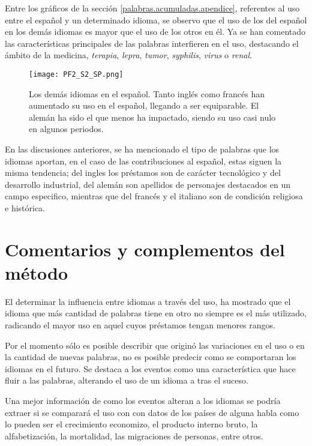 Entre los gráficos de la sección \ref{palabras.acumuladas.apendice},   referentes al uso entre el español y un determinado idioma, se observo que el uso de los del español en los demás idiomas es mayor que el uso de los otros en él.  Ya se han comentado las características principales de las palabras interfieren en el uso, destacando el ámbito de la medicina, \textit{terapia}, \textit{lepra}, \textit{tumor}, \textit{syphilis}, \textit{virus} o \textit{renal}. 

		
\begin{figure}[h!] %
	\centering
	\texttt{[image: PF2\_S2\_SP.png]}
	\label{fig.ST_b_SP}
	\caption{Los demás idiomas en el español.  Tanto inglés como francés han aumentado su uso  en el español, llegando a ser equiparable. El alemán ha sido el que menos ha impactado, siendo su uso casi nulo en  algunos periodos.}
\end{figure}

En las discusiones anteriores, se ha mencionado el tipo de palabras que los idiomas aportan,  en el caso de las contribuciones al español,   estas siguen la misma tendencia; del ingles los préstamos son de carácter tecnológico y del desarrollo industrial, del alemán son apellidos de personajes destacados en un campo especifico, mientras que del francés y el italiano son de condición religiosa e histórica. 






\section{Comentarios y complementos del método} %


El determinar la influencia entre idiomas a través del uso, ha mostrado que el idioma que más cantidad de palabras tiene en otro no siempre es el más utilizado, radicando el mayor uso en aquel cuyos préstamos tengan menores rangos. 

Por el momento sólo es posible describir que originó las variaciones en el uso o en la cantidad de nuevas palabras, no es posible predecir como se comportaran los idiomas en el futuro. Se destaca a los eventos como una característica que  hace fluir a las palabras, alterando el uso de un idioma a tras el suceso. 

Una mejor información de como los eventos alteran a los idiomas se podría extraer si se comparará el uso con con  datos de los países de alguna habla como lo pueden ser  el crecimiento economizo, el producto interno bruto, la alfabetización, la mortalidad, las migraciones de personas, entre otros. 


